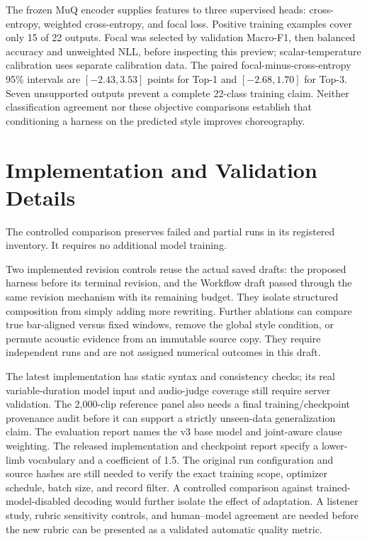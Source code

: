 The frozen MuQ encoder supplies features to three supervised heads:
cross-entropy, weighted cross-entropy, and focal loss. Positive training
examples cover only 15 of 22 outputs. Focal was selected by validation
Macro-F1, then balanced accuracy and unweighted NLL, before inspecting
this preview; scalar-temperature calibration uses separate calibration
data. The paired focal-minus-cross-entropy 95\% intervals are
$[-2.43,3.53]$ points for Top-1 and $[-2.68,1.70]$ for Top-3.
Seven unsupported outputs prevent a complete 22-class training claim.
Neither classification agreement nor these objective comparisons establish
that conditioning a harness on the predicted style improves choreography.

\section{Implementation and Validation Details}
\label{sec:remaining-tests}

The controlled comparison preserves failed and partial runs in its
registered inventory. It requires no additional model training.

Two implemented revision controls reuse the actual saved drafts:
the proposed harness before its terminal revision, and the Workflow
draft passed through the same revision mechanism with its remaining
budget. They isolate structured composition from simply adding more
rewriting. Further ablations can compare true bar-aligned versus fixed
windows, remove the global style condition, or permute acoustic evidence
from an immutable source copy. They require independent runs and are
not assigned numerical outcomes in this draft.

The latest implementation has static syntax and consistency checks;
its real variable-duration model input and audio-judge coverage still
require server validation. The 2,000-clip reference panel also needs a
final training/checkpoint provenance audit before it can support a
strictly unseen-data generalization claim. The evaluation report names
the v3 base model and joint-aware clause weighting. The released
implementation and checkpoint report specify a lower-limb vocabulary
and a coefficient of 1.5. The original run configuration and source
hashes are still needed to verify the exact training scope, optimizer
schedule, batch size, and record filter. A controlled comparison
against trained-model-disabled decoding would further isolate the
effect of adaptation. A listener study, rubric sensitivity controls,
and human--model agreement are needed before the new rubric can be
presented as a validated automatic quality metric.

